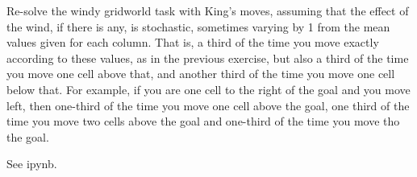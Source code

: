 
\begin{exercise}

Re-solve the windy gridworld task with King's moves, assuming that the effect of the wind, if there is any, is stochastic, sometimes varying by 1 from the mean values given for each column. That is, a third of the time you move exactly according to these values, as in the previous exercise, but also a third of the time you move one cell above that, and another third of the time you move one cell below that. For example, if you are one cell to the right of the goal and you move left, then one-third of the time you move one cell above the goal, one third of the time you move two cells above the goal and one-third of the time you move tho the goal.

\end{exercise}


\begin{solution}

See ipynb.

\end{solution}

